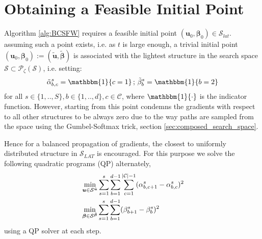 \documentclass[dvipsnames,table,xcdraw]{article}
\newcommand{\mb}[1]{{\boldsymbol{#1}}}
\newcommand{\vu}{\mb{u}}
\newcommand{\bbeta}{\bm{\beta}}
\begin{document}
\vspace{-3mm}
\section{Obtaining a Feasible Initial Point}\label{sec:init_point}
Algorithm \ref{alg:BCSFW} requires a feasible initial point $(\vu_0, \bbeta_0) \in \mathcal{S}_{lat}$. assuming such a point exists, i.e. as $t$ is large enough, a trivial initial point $(\vu_0, \bbeta_0):=(\tilde{\vu}, \tilde{\bbeta})$ is associated with the lightest structure in the search space $\mathcal{S}\subset\mathcal{P}_\zeta(\mathcal{S})$, i.e. setting: 
\begin{align}\label{eqn:trivial_init}
    \tilde{\alpha}^s_{b,c}=\mathbbm{1}\{c=1\} \, ; \, \tilde{\beta}^s_b=\mathbbm{1}\{b=2\}
\end{align} for all $s\in\{1,..,S\}, b\in\{1,..,d\},c\in\mathcal{C}$, where $\mathbbm{1}\{\cdot\}$ is the indicator function.
However, starting from this point condemns the gradients with respect to all other structures to be always zero due to the way paths are sampled from the space using the Gumbel-Softmax trick, section \ref{sec:composed_search_space}.

Hence for a balanced propagation of gradients, the closest to uniformly distributed structure in $\mathcal{S}_{LAT}$ is encouraged. For this purpose we solve the following quadratic programs (QP) alternately,
\begin{align}\label{eqn:qp_init}
  &\min_{\vu\in\mathcal{S}^{\tilde{\vu}}} \sum_{s=1}^s \sum_{b=1}^{d-1}\sum_{c=1}^{|\mathcal{C}|-1} (\alpha^s_{b,c+1}-\alpha^s_{b,c})^2 
  \\
  &\min_{\bbeta\in\mathcal{S}^{\tilde{\bbeta}}} \sum_{s=1}^s \sum_{b=1}^{d-1}(\beta^s_{b+1}-\beta^s_{b})^2
  \notag
\end{align}
using a QP solver at each step. 
\end{document}
